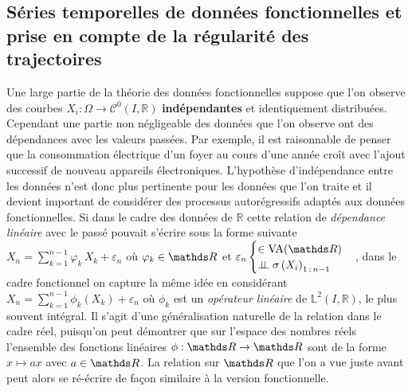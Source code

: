 \subsection{Séries temporelles de données fonctionnelles et prise en compte de la régularité des trajectoires}

Une large partie de la théorie des données fonctionnelles suppose que l'on observe des courbes $X_i : \Omega \rightarrow \mathcal C^0(I, \mathds R)$ \textbf{indépendantes} et identiquement distribuées. Cependant une partie non négligeable des données que l'on observe ont des dépendances avec les valeurs passées. Par exemple, il est raisonnable de penser que la consommation électrique d'un foyer au cours d'une année croît avec l'ajout successif de nouveau appareils électroniques. L'hypothèse d'indépendance entre les données n'est donc plus pertinente pour les données que l'on traite et il devient important de considérer des processus autorégressifs adaptés aux données fonctionnelles. 
Si dans le cadre des données de $\mathds R$ cette relation de \emph{dépendance linéaire} avec le passé pouvait s'écrire sous la forme suivante 
$X_n = \sum\limits_{k=1}^{n-1} \varphi_k \, X_k + \varepsilon_n$ où $\varphi_k \in \grandR$ 
et 
$\varepsilon_n \begin{cases} \in \operatorname{VA}(\grandR) \\ \indep \sigma\left( X_i \right)_{1\,: \, n-1}\end{cases}$, 
dans le cadre fonctionnel on capture la même idée en considérant 
$X_n = \sum\limits_{k=1}^{n-1} \phi_k \left( X_k \right) + \varepsilon_n$ où $\phi_k$ 
est un \emph{opérateur linéaire} de $\mathds L^2(I, \mathds R)$, 
le plus souvent intégral. Il s'agit d'une généralisation naturelle de la relation dans le cadre réel, puisqu'on peut démontrer que sur l'espace des nombres réels l'ensemble des fonctions linéaires $\phi : \grandR \rightarrow \grandR$ sont de la forme $x \mapsto ax$ avec $a \in \grandR$. La relation sur $\grandR$ que l'on a vue juste avant peut alors se ré-écrire de façon similaire à la version fonctionnelle.

\pagebreak

